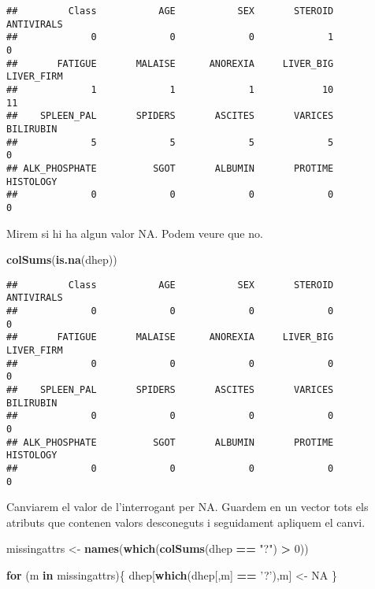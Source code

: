 \documentclass[]{article}
\newenvironment{Shaded}{\begin{snugshade}}{\end{snugshade}}
\newcommand{\ControlFlowTok}[1]{\textcolor[rgb]{0.13,0.29,0.53}{\textbf{#1}}}
\newcommand{\DecValTok}[1]{\textcolor[rgb]{0.00,0.00,0.81}{#1}}
\newcommand{\KeywordTok}[1]{\textcolor[rgb]{0.13,0.29,0.53}{\textbf{#1}}}
\newcommand{\NormalTok}[1]{#1}
\newcommand{\OperatorTok}[1]{\textcolor[rgb]{0.81,0.36,0.00}{\textbf{#1}}}
\newcommand{\OtherTok}[1]{\textcolor[rgb]{0.56,0.35,0.01}{#1}}
\newcommand{\StringTok}[1]{\textcolor[rgb]{0.31,0.60,0.02}{#1}}
\begin{document}
\begin{verbatim}
##         Class           AGE           SEX       STEROID    ANTIVIRALS 
##             0             0             0             1             0 
##       FATIGUE       MALAISE      ANOREXIA     LIVER_BIG    LIVER_FIRM 
##             1             1             1            10            11 
##    SPLEEN_PAL       SPIDERS       ASCITES       VARICES     BILIRUBIN 
##             5             5             5             5             0 
## ALK_PHOSPHATE          SGOT       ALBUMIN       PROTIME     HISTOLOGY 
##             0             0             0             0             0
\end{verbatim}

Mirem si hi ha algun valor NA. Podem veure que no.

\begin{Shaded}
\begin{Highlighting}[]
\KeywordTok{colSums}\NormalTok{(}\KeywordTok{is.na}\NormalTok{(dhep))}
\end{Highlighting}
\end{Shaded}

\begin{verbatim}
##         Class           AGE           SEX       STEROID    ANTIVIRALS 
##             0             0             0             0             0 
##       FATIGUE       MALAISE      ANOREXIA     LIVER_BIG    LIVER_FIRM 
##             0             0             0             0             0 
##    SPLEEN_PAL       SPIDERS       ASCITES       VARICES     BILIRUBIN 
##             0             0             0             0             0 
## ALK_PHOSPHATE          SGOT       ALBUMIN       PROTIME     HISTOLOGY 
##             0             0             0             0             0
\end{verbatim}

Canviarem el valor de l'interrogant per NA. Guardem en un vector tots
els atributs que contenen valors desconeguts i seguidament apliquem el
canvi.

\begin{Shaded}
\begin{Highlighting}[]
\NormalTok{missingattrs <-}\StringTok{ }\KeywordTok{names}\NormalTok{(}\KeywordTok{which}\NormalTok{(}\KeywordTok{colSums}\NormalTok{(dhep }\OperatorTok{==}\StringTok{ "?"}\NormalTok{) }\OperatorTok{>}\StringTok{ }\DecValTok{0}\NormalTok{))}

\ControlFlowTok{for}\NormalTok{ (m }\ControlFlowTok{in}\NormalTok{ missingattrs)\{}
\NormalTok{  dhep[}\KeywordTok{which}\NormalTok{(dhep[,m] }\OperatorTok{==}\StringTok{ '?'}\NormalTok{),m] <-}\StringTok{ }\OtherTok{NA}
\NormalTok{\}}
\end{Highlighting}
\end{Shaded}
\end{document}
